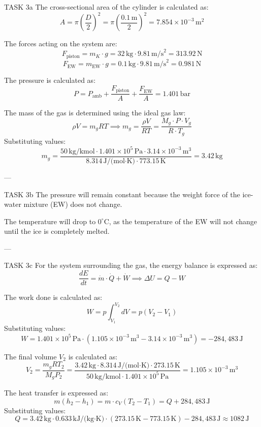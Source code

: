 TASK 3a  
The cross-sectional area of the cylinder is calculated as:  
\[
A = \pi \left(\frac{D}{2}\right)^2 = \pi \left(\frac{0.1 \, \text{m}}{2}\right)^2 = 7.854 \times 10^{-3} \, \text{m}^2
\]  

The forces acting on the system are:  
\[
F_{\text{piston}} = m_K \cdot g = 32 \, \text{kg} \cdot 9.81 \, \text{m/s}^2 = 313.92 \, \text{N}
\]  
\[
F_{\text{EW}} = m_{\text{EW}} \cdot g = 0.1 \, \text{kg} \cdot 9.81 \, \text{m/s}^2 = 0.981 \, \text{N}
\]  

The pressure is calculated as:  
\[
P = P_{\text{amb}} + \frac{F_{\text{piston}}}{A} + \frac{F_{\text{EW}}}{A} = 1.401 \, \text{bar}
\]  

The mass of the gas is determined using the ideal gas law:  
\[
\rho V = m_g R T \implies m_g = \frac{\rho V}{RT} = \frac{M_g \cdot P \cdot V_g}{R \cdot T_g}
\]  
Substituting values:  
\[
m_g = \frac{50 \, \text{kg/kmol} \cdot 1.401 \times 10^5 \, \text{Pa} \cdot 3.14 \times 10^{-3} \, \text{m}^3}{8.314 \, \text{J/(mol·K)} \cdot 773.15 \, \text{K}} = 3.42 \, \text{kg}
\]  

---

TASK 3b  
The pressure will remain constant because the weight force of the ice-water mixture (EW) does not change.  

The temperature will drop to \( 0^\circ\text{C} \), as the temperature of the EW will not change until the ice is completely melted.  

---

TASK 3c  
For the system surrounding the gas, the energy balance is expressed as:  
\[
\frac{dE}{dt} = \dot{m} \cdot \dot{Q} + \dot{W} \implies \Delta U = Q - W
\]  

The work done is calculated as:  
\[
W = p \int_{V_1}^{V_2} dV = p(V_2 - V_1)
\]  
Substituting values:  
\[
W = 1.401 \times 10^5 \, \text{Pa} \cdot (1.105 \times 10^{-3} \, \text{m}^3 - 3.14 \times 10^{-3} \, \text{m}^3) = -284,483 \, \text{J}
\]  

The final volume \( V_2 \) is calculated as:  
\[
V_2 = \frac{m_g R T_2}{M_g P_2} = \frac{3.42 \, \text{kg} \cdot 8.314 \, \text{J/(mol·K)} \cdot 273.15 \, \text{K}}{50 \, \text{kg/kmol} \cdot 1.401 \times 10^5 \, \text{Pa}} = 1.105 \times 10^{-3} \, \text{m}^3
\]  

The heat transfer is expressed as:  
\[
m(h_2 - h_1) = m \cdot c_V (T_2 - T_1) = Q + 284,483 \, \text{J}
\]  
Substituting values:  
\[
Q = 3.42 \, \text{kg} \cdot 0.633 \, \text{kJ/(kg·K)} \cdot (273.15 \, \text{K} - 773.15 \, \text{K}) - 284,483 \, \text{J} \approx 1082 \, \text{J}
\]  

